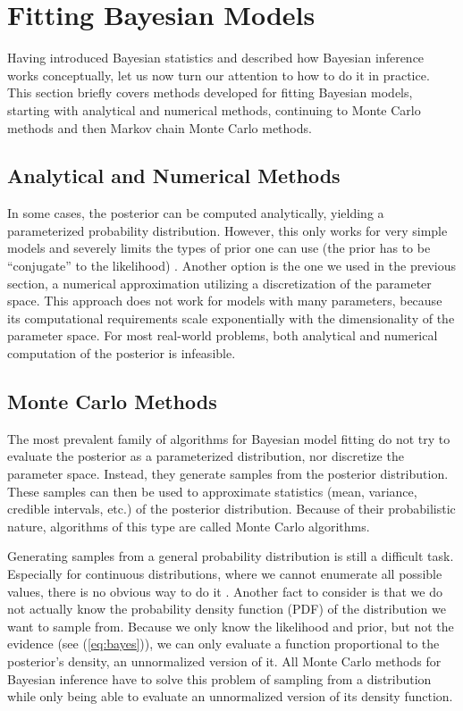 \documentclass[12pt, a4paper]{report}
\begin{document}
\section{Fitting Bayesian Models}
Having introduced Bayesian statistics and described how Bayesian inference works conceptually, let us now turn our attention to how to do it in practice.
This section briefly covers methods developed for fitting Bayesian models, starting with analytical and numerical methods, continuing to Monte Carlo methods and then Markov chain Monte Carlo methods.

\subsection{Analytical and Numerical Methods}
In some cases, the posterior can be computed analytically, yielding a parameterized probability distribution.
However, this only works for very simple models and severely limits the types of prior one can use (the prior has to be ``conjugate'' to the likelihood) \cite[39]{mcelreath}.
Another option is the one we used in the previous section, a numerical approximation utilizing a discretization of the parameter space.
This approach does not work for models with many parameters, because its computational requirements scale exponentially with the dimensionality of the parameter space.
For most real-world problems, both analytical and numerical computation of the posterior is infeasible.

\subsection{Monte Carlo Methods}
The most prevalent family of algorithms for Bayesian model fitting do not try to evaluate the posterior as a parameterized distribution, nor discretize the parameter space.
Instead, they generate samples from the posterior distribution.
These samples can then be used to approximate statistics (mean, variance, credible intervals, etc.) of the posterior distribution.
Because of their probabilistic nature, algorithms of this type are called Monte Carlo algorithms.

Generating samples from a general probability distribution is still a difficult task.
Especially for continuous distributions, where we cannot enumerate all possible values, there is no obvious way to do it \cite[358]{mckay}.
Another fact to consider is that we do not actually know the probability density function (PDF) of the distribution we want to sample from.
Because we only know the likelihood and prior, but not the evidence (see (\ref{eq:bayes})), we can only evaluate a function proportional to the posterior's density, an unnormalized version of it.
All Monte Carlo methods for Bayesian inference have to solve this problem of sampling from a distribution while only being able to evaluate an unnormalized version of its density function.
\end{document}
